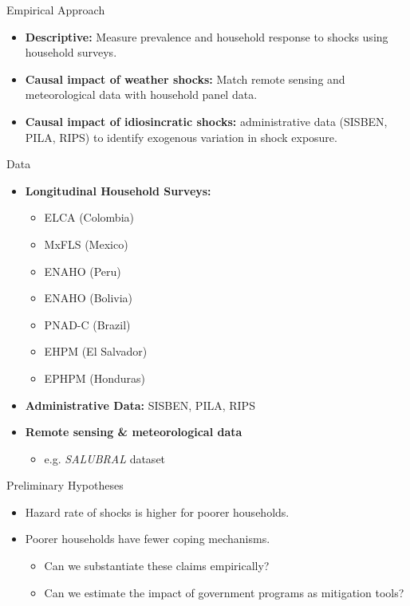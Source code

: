 \documentclass[aspectratio = 169]{beamer}
\begin{document}
  
  \begin{frame}{Empirical Approach}
	\begin{itemize}
	  \item \textbf{Descriptive:} Measure prevalence and household response to shocks using household surveys.
	  \bigskip 
	  
	  \item \textbf{Causal impact of weather shocks:} Match remote sensing and meteorological data with household panel data.
	  \bigskip 

	  \item \textbf{Causal impact of idiosincratic shocks:}  administrative data (SISBEN, PILA, RIPS) to identify exogenous variation in shock exposure.
	\end{itemize}
  \end{frame}
  
  \begin{frame}{Data}
	\begin{itemize}
	  \item \textbf{Longitudinal Household Surveys:}
	  \begin{itemize}
		\item ELCA (Colombia)
		\item MxFLS (Mexico)
		\item ENAHO (Peru)
		\item ENAHO (Bolivia)
		\item PNAD-C (Brazil)
		\item EHPM (El Salvador)
		\item EPHPM (Honduras)
	  \end{itemize}
	  \bigskip

	  \item \textbf{Administrative Data:} SISBEN, PILA, RIPS
	  \bigskip 

	  \item \textbf{Remote sensing \& meteorological data} 
	  \begin{itemize}
			\item e.g. \emph{SALUBRAL} dataset
	  \end{itemize}
	\end{itemize}
  \end{frame}
  
  \begin{frame}{Preliminary Hypotheses}
	\begin{itemize}
	  \item Hazard rate of shocks is higher for poorer households.
	  \medskip
	  \item Poorer households have fewer coping mechanisms.
	  \bigskip
	  \begin{itemize}
	  	\item Can we substantiate these claims empirically?
	  	\medskip
	  	\item Can we estimate the impact of government programs as mitigation tools?
	  \end{itemize}
	\end{itemize}
  \end{frame}
\end{document}
